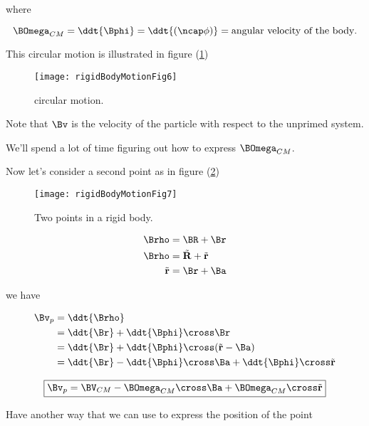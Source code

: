 where

\begin{equation}\label{eqn:rigidBodyMotion:200}
\BOmega_{CM} = \ddt{\Bphi} = \ddt{(\ncap \phi)} = \text{angular velocity of the body}.
\end{equation}


This circular motion is illustrated in figure (\ref{fig:rigidBodyMotion:rigidBodyMotionFig6})

\begin{figure}[htp]
   \centering
   \texttt{[image: rigidBodyMotionFig6]}
   \caption{circular motion.}\label{fig:rigidBodyMotion:rigidBodyMotionFig6}
\end{figure}

Note that $\Bv$ is the velocity of the particle with respect to the unprimed system.

We'll spend a lot of time figuring out how to express $\BOmega_{CM}$.

Now let's consider a second point as in figure (\ref{fig:rigidBodyMotion:rigidBodyMotionFig7})
\begin{figure}[htp]
   \centering
   \texttt{[image: rigidBodyMotionFig7]}
   \caption{Two points in a rigid body.}\label{fig:rigidBodyMotion:rigidBodyMotionFig7}
\end{figure}

\begin{align}\label{eqn:rigidBodyMotion:220}
\Brho &= \BR + \Br \\
\Brho &= \tilde{\mathbf{R}} + \tilde{\mathbf{r}} \\
\tilde{\mathbf{r}} &= \Br + \Ba
\end{align}

we have

\begin{align*}
\Bv_p
&=
\ddt{\Brho} \\
&= \ddt{\Br} + \ddt{\Bphi} \cross \Br \\
&= \ddt{\Br} + \ddt{\Bphi} \cross (\tilde{\mathbf{r}} - \Ba) \\
&= \ddt{\Br} - \ddt{\Bphi} \cross \Ba + \ddt{\Bphi} \cross \tilde{\mathbf{r}} 
\end{align*}

\begin{equation}\label{eqn:rigidBodyMotion:240}
\boxed{
\Bv_p = \BV_{CM} - 
\BOmega_{CM} \cross \Ba
+\BOmega_{CM} \cross \tilde{\mathbf{r}}
}
\end{equation}

Have another way that we can use to express the position of the point 

